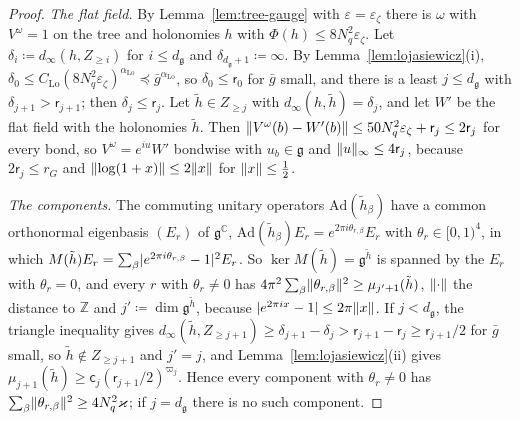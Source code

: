 \documentclass[11pt]{preprint}
\DeclarePairedDelimiter{\abs}{\lvert}{\rvert}
\DeclarePairedDelimiter{\norm}{\lVert}{\rVert}
\numberwithin{equation}{section}
\theoremstyle{definition}
\theoremstyle{remark}
\theoremstyle{plain}
\begin{document}
\begin{proof}
\emph{The flat field.} By Lemma~\ref{lem:tree-gauge} with $\varepsilon = \varepsilon_\zeta$ there is $\omega$ with $V^\omega = 1$ on the tree and holonomies $h$ with $\Phi(h) \leq 8N_q^2\varepsilon_\zeta$. Let $\delta_i \coloneqq d_\infty(h, Z_{\geq i})$ for $i \leq d_{\mathfrak g}$ and $\delta_{d_{\mathfrak g}+1} \coloneqq \infty$. By Lemma~\ref{lem:lojasiewicz}(i), $\delta_0 \leq C_{\mathrm{Lo}}(8N_q^2\varepsilon_\zeta)^{\alpha_{\mathrm{Lo}}} \preceq \bar g^{\alpha_{\mathrm{Lo}}}$, so $\delta_0 \leq \mathsf r_0$ for $\bar g$ small, and there is a least $j \leq d_{\mathfrak g}$ with $\delta_{j+1} > \mathsf r_{j+1}$; then $\delta_j \leq \mathsf r_j$. Let $\tilde h \in Z_{\geq j}$ with $d_\infty(h, \tilde h) = \delta_j$, and let $W'$ be the flat field with the holonomies $\tilde h$. Then $\norm{V^\omega(b) - W'(b)} \leq 50N_q^2\varepsilon_\zeta + \mathsf r_j \leq 2\mathsf r_j$ for every bond, so $V^\omega = e^{iu}W'$ bondwise with $u_b \in \mathfrak g$ and $\norm u_\infty \leq 4\mathsf r_j$, because $2\mathsf r_j \leq r_G$ and $\norm{\log(1 + x)} \leq 2\norm x$ for $\norm x \leq \frac12$.

\emph{The components.} The commuting unitary operators $\mathrm{Ad}(\tilde h_\beta)$ have a common orthonormal eigenbasis $(E_r)$ of $\mathfrak g^{\mathbb C}$, $\mathrm{Ad}(\tilde h_\beta)E_r = e^{2\pi i\theta_{r,\beta}}E_r$ with $\theta_r \in [0, 1)^4$, in which $M(\tilde h)E_r = \sum_\beta\abs{e^{2\pi i\theta_{r,\beta}} - 1}^2E_r$. So $\ker M(\tilde h) = \mathfrak g^{\tilde h}$ is spanned by the $E_r$ with $\theta_r = 0$, and every $r$ with $\theta_r \neq 0$ has $4\pi^2\sum_\beta\norm{\theta_{r,\beta}}^2 \geq \mu_{j'+1}(\tilde h)$, $\norm\cdot$ the distance to $\mathbb Z$ and $j' \coloneqq \dim\mathfrak g^{\tilde h}$, because $\abs{e^{2\pi ix} - 1} \leq 2\pi\norm x$. If $j < d_{\mathfrak g}$, the triangle inequality gives $d_\infty(\tilde h, Z_{\geq j+1}) \geq \delta_{j+1} - \delta_j > \mathsf r_{j+1} - \mathsf r_j \geq \mathsf r_{j+1}/2$ for $\bar g$ small, so $\tilde h \notin Z_{\geq j+1}$ and $j' = j$, and Lemma~\ref{lem:lojasiewicz}(ii) gives $\mu_{j+1}(\tilde h) \geq \mathsf c_j(\mathsf r_{j+1}/2)^{\varpi_j}$. Hence every component with $\theta_r \neq 0$ has $\sum_\beta\norm{\theta_{r,\beta}}^2 \geq 4N_q^2\varkappa$; if $j = d_{\mathfrak g}$ there is no such component.


\end{proof}
\end{document}
